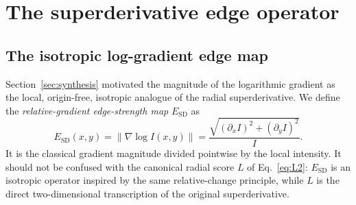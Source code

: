 \documentclass[conference]{IEEEtran}
\begin{document}
\section{The superderivative edge operator}
\label{sec:operator}
\subsection{The isotropic log-gradient edge map}
Section~\ref{sec:synthesis} motivated the magnitude of the logarithmic
gradient as the local, origin-free, isotropic analogue of the
radial superderivative.  We
define the \emph{relative-gradient edge-strength map} $E_{\mathrm{SD}}$ as
\begin{equation}
E_{\mathrm{SD}}(x,y)=\|\nabla\log I(x,y)\|
=\frac{\sqrt{(\partial_x I)^2+(\partial_y I)^2}}{I}.
\label{eq:Esd}
\end{equation}
It is the classical gradient magnitude divided pointwise by the local
intensity.  It should not be confused with the canonical radial score $L$
of Eq.~\eqref{eq:L2}: $E_{\mathrm{SD}}$ is an isotropic operator inspired by
the same relative-change principle, while $L$ is the direct two-dimensional
transcription of the original superderivative.
\end{document}

